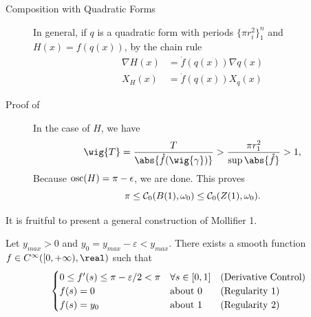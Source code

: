 \documentclass[../main-v2-manifolds.tex]{subfiles}
\begin{document}
\begin{description}
\item[Composition with Quadratic Forms]
    In general, if $q$ is a quadratic form with periods $\{\pi r_i^2\}_1^n$ and $H(x) = f(q(x))$, by the chain rule
\begin{align*}
    \nabla H(x) &= \mathring{f}(q(x))\nabla q(x) \\ 
    X_H(x) &= \mathring{f}(q(x))X_q(x)
\end{align*}
\item[Proof of ]
In the case of $H$, we have 
\[
    \wig{T} = \dfrac{T}{\abs{\mathring{f}(\wig{\gamma})}} > \dfrac{\pi r_1^2}{\sup\abs{\mathring{f}}} > 1,
\]
Because $\mathrm{osc}(H) = \pi - \epsilon$, we are done. This proves
\[
\pi \leq \mathcal{C}_0(B(1), \omega_0) \leq \mathcal{C}_0(Z(1), \omega_0).
\]
\end{description}
It is fruitful to present a general construction of Mollifier 1.
\begin{wts}\label{wts:generalized mollifier 1}
    Let $y_{max}>0$ and $y_0 = y_{max} - \varepsilon< y_{max}$. There exists a smooth function $f\in C^\infty([0,+\infty), \real)$ such that 
    \[
    \begin{cases}        
        0 \leq f'(s) \leq \pi-\varepsilon/2 < \pi &  \forall s\in[0,1] \quad \text{(Derivative Control)} \\
        f(s) = 0 & \text{about } $0$ \quad \ \ \: \text{(Regularity 1)} \\ 
        f(s) = y_0 & \text{about } $1$ \quad\ \ \:  \text{(Regularity 2)}
    \end{cases}    \]
\end{wts}
\end{document}
